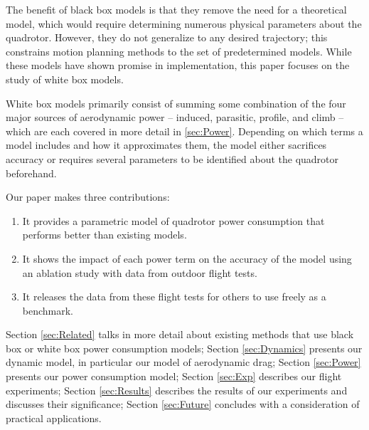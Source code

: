 The benefit of black box models is that they remove the need for a theoretical model, which would require determining numerous physical parameters about the quadrotor. However, they do not generalize to any desired trajectory; this constrains motion planning methods to the set of predetermined models. While these models have shown promise in implementation, this paper focuses on the study of white box models. 

White box models primarily consist of summing some combination of the four major sources of aerodynamic power -- induced, parasitic, profile, and climb -- which are each covered in more detail in \ref{sec:Power}. Depending on which terms a model includes and how it approximates them, the model either sacrifices accuracy or requires several parameters to be identified about the quadrotor beforehand. 

Our paper makes three contributions:
\begin{enumerate}
	\item It provides a parametric model of quadrotor power consumption that performs better than existing models.
	\item It shows the impact of each power term on the accuracy of the model using an ablation study with data from outdoor flight tests.
	\item It releases the data from these flight tests for others to use freely as a benchmark.
\end{enumerate} 
Section \ref{sec:Related} talks in more detail about existing methods that use black box or white box power consumption models; Section \ref{sec:Dynamics} presents our dynamic model, in particular our model of aerodynamic drag; Section \ref{sec:Power} presents our power consumption model; Section \ref{sec:Exp} describes our flight experiments; Section \ref{sec:Results} describes the results of our experiments and discusses their significance; Section \ref{sec:Future} concludes with a consideration of practical applications.






